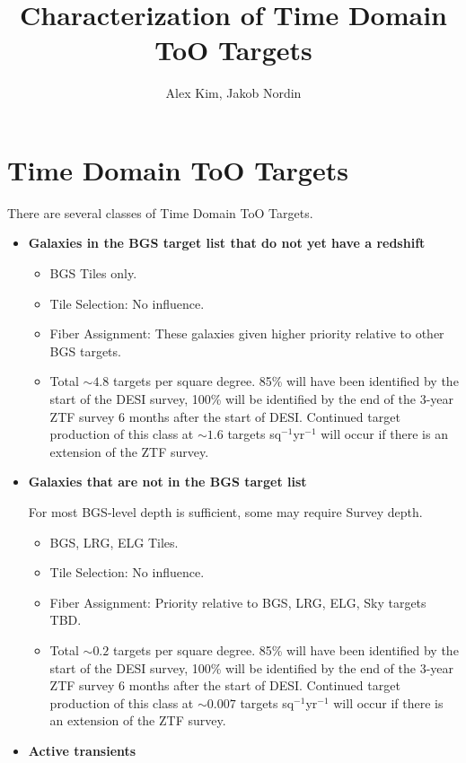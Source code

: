 \documentclass[11pt, oneside]{article}   	%
\title{Characterization of Time Domain ToO Targets}
\author{Alex Kim, Jakob Nordin}
\begin{document}
\maketitle
\section{Time Domain ToO Targets}
There are several classes of Time Domain ToO Targets.  
\begin{itemize}
\item {\bf Galaxies in the BGS target list that do not yet have a redshift}

\begin{itemize}
\item BGS Tiles only.
\item Tile Selection: No influence.
\item Fiber Assignment: These galaxies given higher priority relative to other BGS targets.
\item Total $\sim 4.8$ targets per square degree.  85\% will have been identified by the start of the DESI survey, 100\% will be
identified by the end of the 3-year ZTF survey 6 months after the start of DESI.   Continued target production of this class at $\sim 1.6$ targets sq$^{-1}$yr$^{-1}$ will occur if there is an extension
of the ZTF survey.
\end{itemize}
\item {\bf Galaxies that are not in the BGS target list}

For most BGS-level depth is sufficient, some may require Survey depth.
\begin{itemize}
\item BGS, LRG, ELG Tiles.
\item Tile Selection: No influence. 
\item Fiber Assignment: Priority relative to BGS, LRG, ELG, Sky targets TBD.
\item Total $\sim 0.2$ targets per square degree.  85\% will have been identified by the start of the DESI survey, 100\% will be
identified by the end of the 3-year ZTF survey 6 months after the start of DESI.
Continued target production of this class  at $\sim 0.007$ targets sq$^{-1}$yr$^{-1}$ will occur if there is an extension
of the ZTF survey.
\end{itemize}
\item {\bf Active transients}


\end{itemize}
\end{document}
